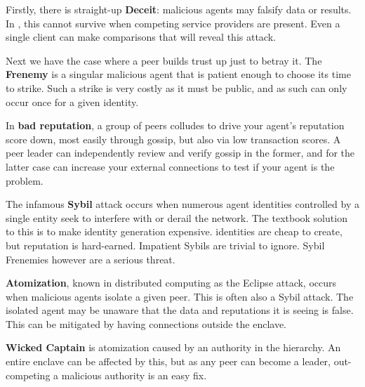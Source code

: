 Firstly, there is straight-up \textbf{Deceit}: malicious agents may falsify data or results.
In \projectName, this cannot survive when competing service providers are present.
Even a single client can make comparisons that will reveal this attack.

Next we have the case where a peer builds trust up just to betray it.
The \textbf{Frenemy} is a singular malicious agent that is patient enough to choose its time to strike.
Such a strike is very costly as it must be public, and as such can only occur once for a given identity.

In \textbf{bad reputation}, a group of peers colludes to drive your agent's reputation score down, most easily through gossip, but also via low transaction scores.
A peer leader can independently review and verify gossip in the former, and for the latter case can increase your external connections to test if your agent is the problem.

The infamous \textbf{Sybil} attack occurs when numerous agent identities controlled by a single entity seek to interfere with or derail the network.
The textbook solution to this is to make identity generation expensive. \projectName identities are cheap to create, but reputation is hard-earned.
Impatient Sybils are trivial to ignore.
Sybil Frenemies however are a serious threat.

\textbf{Atomization}, known in distributed computing as the Eclipse attack, occurs when malicious agents isolate a given peer.
This is often also a Sybil attack.
The isolated agent may be unaware that the data and reputations it is seeing is false.
This can be mitigated by having connections outside the enclave.

\textbf{Wicked Captain} is atomization caused by an authority in the hierarchy.
An entire enclave can be affected by this, but as any peer can become a leader, out-competing a malicious authority is an easy fix.